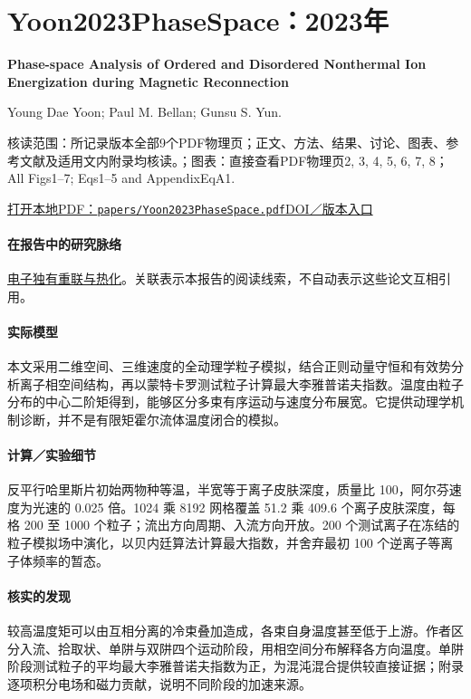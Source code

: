 \documentclass[UTF8,a4paper,11pt,openany,fontset=fandol]{ctexbook}
\begin{document}
\section{Yoon2023PhaseSpace：2023年}\label{paper:Yoon2023PhaseSpace}

\textbf{Phase-space Analysis of Ordered and Disordered Nonthermal Ion Energization during Magnetic Reconnection}\citep{Yoon2023PhaseSpace}\

Young Dae Yoon;  Paul M. Bellan;  Gunsu S. Yun.

\textsf{核读范围：}所记录版本全部9个PDF物理页；正文、方法、结果、讨论、图表、参考文献及适用文内附录均核读。；\textsf{图表：}直接查看PDF物理页2, 3, 4, 5, 6, 7, 8；All Figs1–7;  Eqs1–5 and AppendixEqA1.

\href{run:../papers/Yoon2023PhaseSpace.pdf}{打开本地PDF：\texttt{papers/Yoon2023PhaseSpace.pdf}}\quad\href{https://doi.org/10.3847/1538-4357/acf1f5}{DOI／版本入口}

\paragraph{在报告中的研究脉络}\hyperref[story:energy]{电子独有重联与热化}。关联表示本报告的阅读线索，不自动表示这些论文互相引用。

\paragraph{实际模型}本文采用二维空间、三维速度的全动理学粒子模拟，结合正则动量守恒和有效势分析离子相空间结构，再以蒙特卡罗测试粒子计算最大李雅普诺夫指数。温度由粒子分布的中心二阶矩得到，能够区分多束有序运动与速度分布展宽。它提供动理学机制诊断，并不是有限矩霍尔流体温度闭合的模拟。

\paragraph{计算／实验细节}反平行哈里斯片初始两物种等温，半宽等于离子皮肤深度，质量比 100，阿尔芬速度为光速的 0.025 倍。1024 乘 8192 网格覆盖 51.2 乘 409.6 个离子皮肤深度，每格 200 至 1000 个粒子；流出方向周期、入流方向开放。200 个测试离子在冻结的粒子模拟场中演化，以贝内廷算法计算最大指数，并舍弃最初 100 个逆离子等离子体频率的暂态。

\paragraph{核实的发现}较高温度矩可以由互相分离的冷束叠加造成，各束自身温度甚至低于上游。作者区分入流、拾取状、单阱与双阱四个运动阶段，用相空间分布解释各方向温度。单阱阶段测试粒子的平均最大李雅普诺夫指数为正，为混沌混合提供较直接证据；附录逐项积分电场和磁力贡献，说明不同阶段的加速来源。
\end{document}
